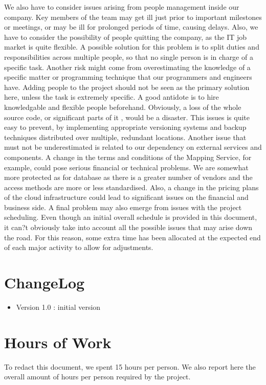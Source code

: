 \documentclass{article}
\begin{document}
\begin{flushleft}
We also have to consider issues arising from people management inside our company. Key members of the team may get ill just prior to important milestones or meetings, or may be ill for prolonged periods of time, causing delays. Also, we have to consider the possibility of people quitting the company, as the IT job market is quite flexible. A possible solution for this problem is to split duties and responsibilities across multiple people, so that no single person is in charge of a specific task.
Another risk might come from overestimating the knowledge of a specific matter or programming technique that our programmers and engineers have. Adding people to the project should not be seen as the primary solution here, unless the task is extremely specific. A good antidote is to hire knowledgable and flexible people beforehand.
Obviously, a loss of the whole source code, or significant parts of it , would be a disaster. This issues is quite easy to prevent, by implementing appropriate versioning systems and backup techniques distributed over multiple, redundant locations.
Another issue that must not be underestimated is related to our dependency on external services and components. A change in the terms and conditions of the Mapping Service, for example, could pose serious financial or technical problems. We are somewhat more protected as for database  as there is a greater number of vendors and the access methods are more or less standardised.
 Also, a change in the pricing plans of the cloud infrastructure could lead to significant issues on the financial and business side.
 A final problem may also emerge from issues with the project scheduling. Even though an initial overall schedule is provided in this document, it can?t obviously take into account all the possible issues that may arise down the road. For this reason, some extra time has been allocated at the expected end of each major activity to allow for adjustments.


\section{ChangeLog} %
\begin{itemize}
\item Version 1.0 : initial version
\end{itemize}
\section{Hours of Work} %

To redact this document, we spent 15 hours per person. We also report here the overall amount of hours per person required by the project.


 \end{flushleft}
\end{document}
